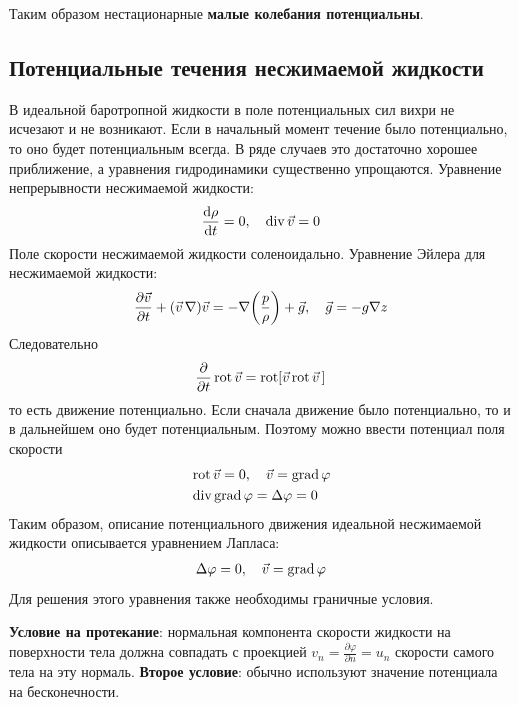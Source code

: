 Таким образом нестационарные \textbf{малые колебания потенциальны}.


\subsection{Потенциальные течения несжимаемой жидкости}

В идеальной баротропной жидкости в поле потенциальных сил вихри не исчезают и не возникают. Если в начальный момент течение было потенциально, то оно будет потенциальным всегда. В ряде случаев это достаточно хорошее приближение, а уравнения гидродинамики существенно упрощаются. 
Уравнение непрерывности несжимаемой жидкости:
\begin{align*}
\frac { \dd \rho } { \dd t } = 0 ,\quad \operatorname{div} \vec{v} = 0
\end{align*}
Поле скорости несжимаемой жидкости соленоидально. Уравнение Эйлера для несжимаемой жидкости:
\begin{align*}
\frac { \partial \vec{v} } { \partial t } + ( \vec{v}\,\nabla ) \vec{v} = - \nabla\qty(\frac {  p } { \rho }) + \vec { g }, \quad \vec { g } = - g \nabla z
\end{align*}
Следовательно
\begin{align*}
\pdv{t}\operatorname{rot}\vec{v} =\operatorname{rot}[ \vec{v}\operatorname{rot}\vec{v}  \, ]
\end{align*}
то есть движение потенциально. Если сначала движение было потенциально, то и в дальнейшем оно будет потенциальным. Поэтому можно ввести потенциал поля скорости
\begin{align*}
 &\operatorname{rot} \vec{v} = 0 , \quad  { \vec{v} =\operatorname{grad}\varphi } \\  
 &\operatorname { div\, grad } \varphi = \Delta \varphi = 0 
\end{align*}
Таким образом, описание потенциального движения идеальной несжимаемой жидкости описывается уравнением Лапласа:
\begin{align*}
\Delta \varphi = 0 , \quad \vec{v} =\operatorname{grad} \varphi
\end{align*}
Для решения этого уравнения также необходимы граничные условия.

\textbf{Условие на протекание}: нормальная компонента скорости жидкости на поверхности тела должна совпадать с проекцией $v_n=\frac { \partial \varphi } { \partial n }=u_n$ скорости самого тела на эту нормаль. \textbf{Второе условие}: обычно используют значение потенциала на бесконечности.

